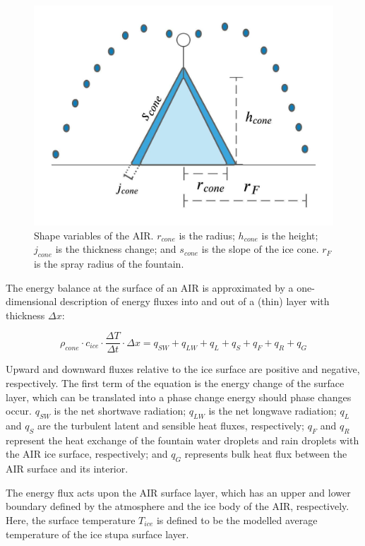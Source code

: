 \begin{figure}
	\begin{center}
		\includegraphics[width=10 cm]{figs/AIR_schematic.jpeg}
	\end{center}
	\caption{Shape variables of the \ac{AIR}. $r_{cone}$ is the radius; $h_{cone}$ is the height; $j_{cone}$ is the
		thickness change; and $s_{cone}$ is the slope of the ice cone. $r_F$ is the spray radius of the fountain.}
	\label{fig:shape}
\end{figure}

The energy balance at the surface of an \ac{AIR} is approximated by a one-dimensional description of energy fluxes
into and out of a (thin) layer with thickness $\Delta x$:

\begin{equation}
	\rho_{cone} \cdot c_{ice} \cdot \frac{\Delta T}{\Delta t} \cdot \Delta x = q_{SW} + q_{LW} + q_{L} + q_{S} + q_{F}+ q_{R} + q_{G}
	\label{eqn:EB}
\end{equation}

Upward and downward fluxes relative to the ice surface are positive and negative, respectively. The first term
of the equation is the energy change of the surface layer, which can be translated into a phase change energy should phase
changes occur. $q_{SW}$ is the net shortwave radiation; $q_{LW}$ is the net longwave radiation; $q_{L}$ and
$q_{S}$ are the turbulent latent and sensible heat fluxes, respectively; $q_{F}$ and $q_{R}$ represent the heat exchange of
the fountain water droplets and rain droplets with the \ac{AIR} ice surface, respectively; and $q_{G}$ represents bulk
heat flux between the \ac{AIR} surface and its interior.

The energy flux acts upon the \ac{AIR} surface layer, which has an upper and lower boundary defined by the atmosphere
and the ice body of the \ac{AIR}, respectively. Here, the surface temperature $T_{ice}$ is defined to be the modelled
average temperature of the ice stupa surface layer.

